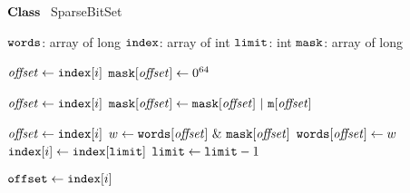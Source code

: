     \STATE $\textbf{Class~}$ SparseBitSet
    \item[]
      \STATE $\texttt{words}$: array of long 
      \STATE $\texttt{index}$: array of int 
      \STATE $\texttt{limit}$: int 
      \STATE $\texttt{mask}$: array of long 
    \item[]
      \Endfunc
    \item[]
        \STATE $\mathit{offset} \leftarrow \texttt{index}[i]$
        \STATE $\texttt{mask}[\mathit{offset}] \leftarrow 0^{64}$
      \ENDFOR
      \Endfunc


    \item[]
      \STATE $\mathit{offset} \leftarrow \texttt{index}[i]$
      \STATE $\texttt{mask}[\localvar{offset}] \leftarrow \texttt{mask}[\localvar{offset}] \ | \ 
      \texttt{m}[\localvar{offset}]$ 
      \ENDFOR
      \Endfunc

    \item[]
      \STATE $\mathit{offset} \leftarrow \texttt{index}[i]$
      \STATE $w \leftarrow \texttt{words}[\mathit{offset}] \ \& \ \texttt{mask}[\mathit{offset}]$ 
      \IF{$w \neq \Words[\localvar{offset}]$}
      \STATE $\texttt{words}[\mathit{offset}] \leftarrow w$
      \STATE $\texttt{index}[i] \leftarrow \texttt{index}[\texttt{limit}]$
      \STATE $\texttt{limit} \leftarrow \texttt{limit} - 1$
      \ENDIF
      \ENDIF
      \ENDFOR
      \Endfunc

    \item[]
      \STATE $\texttt{offset} \leftarrow \texttt{index}[i]$
      \RETURN{$\Offset$}
      \ENDIF
      \ENDFOR
      \Endfunc


